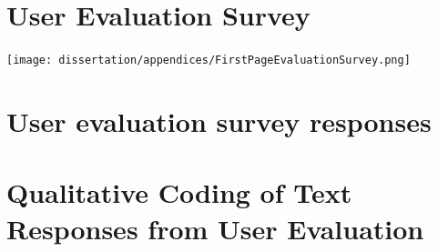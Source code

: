 \documentclass{l4proj}
\begin{document}
\begin{appendices}
\chapter{User Evaluation Survey}
\begin{center}
\centering
\texttt{[image: dissertation/appendices/FirstPageEvaluationSurvey.png]}
\end{center}



\chapter{User evaluation survey responses}

\chapter{Qualitative Coding of Text Responses from User Evaluation}

\end{appendices}






\end{document}
